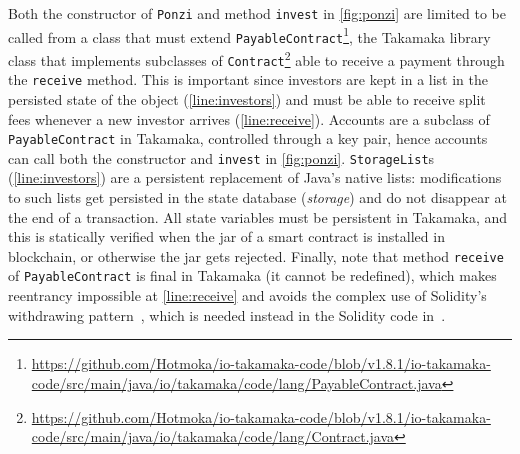 Both the constructor of \texttt{Ponzi} and method \texttt{invest} in \cref{fig:ponzi}
are limited to be called from a class that must extend \texttt{PayableContract}\footnote{\url{https://github.com/Hotmoka/io-takamaka-code/blob/v1.8.1/io-takamaka-code/src/main/java/io/takamaka/code/lang/PayableContract.java}}, the
Takamaka library class that implements subclasses of \texttt{Contract}\footnote{\url{https://github.com/Hotmoka/io-takamaka-code/blob/v1.8.1/io-takamaka-code/src/main/java/io/takamaka/code/lang/Contract.java}}
able to receive a payment through the
\texttt{receive} method. This is important since investors are kept in a list in the
persisted state of the object (\cref{line:investors}) and must be able to receive
split fees whenever a new investor arrives (\cref{line:receive}). Accounts
are a subclass of \texttt{PayableContract} in Takamaka, controlled through a key pair,
hence accounts can call both the constructor and \texttt{invest} in \cref{fig:ponzi}.
\texttt{StorageList}s (\cref{line:investors}) are a persistent replacement
of Java's native lists: modifications to such lists get persisted in the
state database (\emph{storage})
and do not disappear at the end of a transaction. All state
variables must be persistent in Takamaka, and this is statically verified
when the jar of a smart contract is installed in blockchain,
or otherwise the jar gets rejected.
Finally, note that method \texttt{receive} of
\texttt{PayableContract} is final in Takamaka (\ieinitial it cannot be redefined),
which makes reentrancy impossible at \cref{line:receive} and avoids the complex use of
Solidity's withdrawing pattern~\citep{AntonopoulosWPMP25}, which is needed instead
in the Solidity code in~\cite{IyerD18}.

